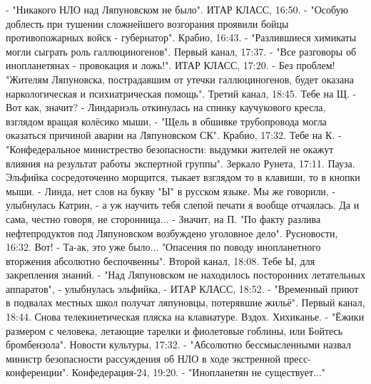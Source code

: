 - "Никакого НЛО над Ляпуновском не было". ИТАР КЛАСС, 16:50.
 - "Особую доблесть при тушении сложнейшего возгорания проявили бойцы противопожарных войск - губернатор". Крабио, 16:43.
 - "Разлившиеся химикаты могли сыграть роль галлюциногенов". Первый канал, 17:37.
 - "Все разговоры об инопланетянах - провокация и ложь!". ИТАР КЛАСС, 17:20.
 - Без проблем! "Жителям Ляпуновска, пострадавшим от утечки галлюциногенов, будет оказана наркологическая и психиатрическая помощь". Третий канал, 18:45. Тебе на Щ.
 - Вот как, значит? - Линдариэль откинулась на спинку каучукового кресла, взглядом вращая колёсико мыши, - "Щель в обшивке трубопровода могла оказаться причиной аварии на Ляпуновском СК". Крабио, 17:32. Тебе на К.
 - "Конфедеральное министрество безопасности: выдумки жителей не окажут влияния на результат работы экспертной группы". Зеркало Рунета, 17:11.
Пауза. Эльфийка сосредоточенно морщится, тыкает взглядом то в клавиши, то в кнопки мыши.
 - Линда, нет слов на букву "Ы" в русском языке. Мы же говорили, - улыбнулась Катрин, - а уж научить тебя слепой печати я вообще отчаялась. Да и сама, честно говоря, не сторонница...
 - Значит, на П. "По факту разлива нефтепродуктов под Ляпуновском возбуждено уголовное дело". Русновости, 16:32. Вот!
 - Та-ак, это уже было... "Опасения по поводу инопланетного вторжения абсолютно беспочвенны". Второй канал, 18:08. Тебе Ы, для закрепления знаний.
 - "Над Ляпуновском не находилось посторонних летательных аппаратов", - улыбнулась эльфийка, - ИТАР КЛАСС, 18:52.
 - "Временный приют в подвалах местных школ получат ляпуновцы, потерявшие жильё". Первый канал, 18:44.
Снова телекинетическая пляска на клавиатуре. Вздох. Хихиканье.
 - "Ёжики размером с человека, летающие тарелки и фиолетовые гоблины, или Бойтесь бромбензола". Новости культуры, 17:32.
 - "Абсолютно бессмысленными назвал министр безопасности рассуждения об НЛО в ходе экстренной пресс-конференции". Конфедерация-24, 19:20.
 - "Инопланетян не существует..."

